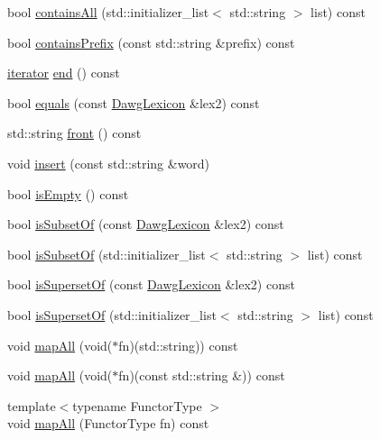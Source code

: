 \begin{DoxyCompactItemize}
\item 
bool \mbox{\hyperlink{classDawgLexicon_a3934298595e72e6540e5f81d47ab763a}{contains\+All}} (std\+::initializer\+\_\+list$<$ std\+::string $>$ list) const
\item 
bool \mbox{\hyperlink{classDawgLexicon_a0b8e0b0b6f72ba6b88b56bd074b1dc32}{contains\+Prefix}} (const std\+::string \&prefix) const
\item 
\mbox{\hyperlink{classDawgLexicon_1_1iterator}{iterator}} \mbox{\hyperlink{classDawgLexicon_a68b688a51bd0cf6fb5bc2cba292209a8}{end}} () const
\item 
bool \mbox{\hyperlink{classDawgLexicon_a548d3aa2e2086be0f8db9868d5dfd6e1}{equals}} (const \mbox{\hyperlink{classDawgLexicon}{Dawg\+Lexicon}} \&lex2) const
\item 
std\+::string \mbox{\hyperlink{classDawgLexicon_a054217ec9f3229ceedee9d7bde075587}{front}} () const
\item 
void \mbox{\hyperlink{classDawgLexicon_a1a017af6eb755b5c83e70f61e2bda2c7}{insert}} (const std\+::string \&word)
\item 
bool \mbox{\hyperlink{classDawgLexicon_acf82f9b2937375c7b1cf3dccb3df3312}{is\+Empty}} () const
\item 
bool \mbox{\hyperlink{classDawgLexicon_adbfb8a4218cbe3c3686cd58e63bb9193}{is\+Subset\+Of}} (const \mbox{\hyperlink{classDawgLexicon}{Dawg\+Lexicon}} \&lex2) const
\item 
bool \mbox{\hyperlink{classDawgLexicon_a2a0f1241b53bcf0b31103b79cb01b87d}{is\+Subset\+Of}} (std\+::initializer\+\_\+list$<$ std\+::string $>$ list) const
\item 
bool \mbox{\hyperlink{classDawgLexicon_a16ee2d6dbb050435a7f5cf4dd0cc777c}{is\+Superset\+Of}} (const \mbox{\hyperlink{classDawgLexicon}{Dawg\+Lexicon}} \&lex2) const
\item 
bool \mbox{\hyperlink{classDawgLexicon_a217cbc1e6ba9f694645608c8a17c1943}{is\+Superset\+Of}} (std\+::initializer\+\_\+list$<$ std\+::string $>$ list) const
\item 
void \mbox{\hyperlink{classDawgLexicon_a2e4e14ffb291ba4d5475b9b66d2a12c8}{map\+All}} (void($\ast$fn)(std\+::string)) const
\item 
void \mbox{\hyperlink{classDawgLexicon_abab83598d63d43b15cf018fa020e1ddf}{map\+All}} (void($\ast$fn)(const std\+::string \&)) const
\item 
{\footnotesize template$<$typename Functor\+Type $>$ }\\void \mbox{\hyperlink{classDawgLexicon_a8dc32c1e45704cfae41daf8adb4e66dc}{map\+All}} (Functor\+Type fn) const

\end{DoxyCompactItemize}
